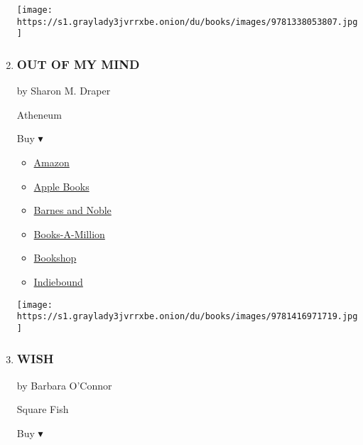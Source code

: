 \begin{enumerate}
  \texttt{[image: https://s1.graylady3jvrrxbe.onion/du/books/images/9781338053807.jpg]}
\item
  \hypertarget{out-of-my-mind}{%
  \subsubsection{OUT OF MY MIND}\label{out-of-my-mind}}

  by Sharon M. Draper

  Atheneum

  Buy ▾

  \begin{itemize}
  \tightlist
  \item
    \href{http://www.amazon.com/Out-My-Mind-Sharon-Draper/dp/1416971718?tag=NYTBS-20}{Amazon}
  \item
    \href{https://du-gae-books-dot-nyt-du-prd.appspot.com/buy?title=OUT+OF+MY+MIND\&author=Sharon+M+Draper}{Apple
    Books}
  \item
    \href{https://www.anrdoezrs.net/click-7990613-11819508?url=https\%3A\%2F\%2Fwww.barnesandnoble.com\%2Fw\%2F\%3Fean\%3D9781416971719}{Barnes
    and Noble}
  \item
    \href{https://www.anrdoezrs.net/click-7990613-35140?url=https\%3A\%2F\%2Fwww.booksamillion.com\%2Fp\%2FOUT\%2BOF\%2BMY\%2BMIND\%2FSharon\%2BM\%2BDraper\%2F9781416971719}{Books-A-Million}
  \item
    \href{https://bookshop.org/a/3546/9781416971719}{Bookshop}
  \item
    \href{https://www.indiebound.org/book/9781416971719?aff=NYT}{Indiebound}
  \end{itemize}

  \texttt{[image: https://s1.graylady3jvrrxbe.onion/du/books/images/9781416971719.jpg]}
\item
  \hypertarget{wish}{%
  \subsubsection{WISH}\label{wish}}

  by Barbara O'Connor

  Square Fish

  Buy ▾


\end{enumerate}
